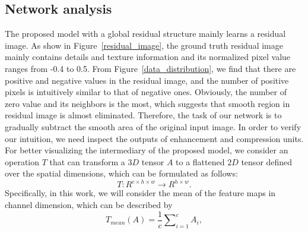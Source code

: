 \documentclass[10pt,twocolumn,letterpaper]{article}
\begin{document}
\subsection{Network analysis}
The proposed model with a global residual structure mainly learns a residual image. As show in Figure~\ref{residual_image}, the ground truth residual image mainly contains details and texture information and its normalized pixel value ranges from -0.4 to 0.5. From Figure~\ref{data_distribution}, we find that there are positive and negative values in the residual image, and the number of positive pixels is intuitively similar to that of negative ones. Obviously, the number of zero value and its neighbors is the most, which suggests that smooth region in residual image is almost eliminated. Therefore, the task of our network is to gradually subtract the smooth area of the original input image. In order to verify our intuition, we need inspect the outputs of enhancement and compression units. For better visualizing the intermediary of the proposed model, we consider an operation $T$ that can transform a $3D$ tensor $A$ to a flattened $2D$ tensor defined over the spatial dimensions, which can be formulated as follows:
\begin{equation}
T:{R^{c \times h \times w}} \to {R^{h \times w}}.
\end{equation}
Specifically, in this work, we will consider the mean of the feature maps in channel dimension, which can be described by
\begin{equation}
{T_{mean}}\left( A \right) = \frac{1}{c}\sum\nolimits_{i = 1}^c {{A_i}} ,
\end{equation}
\end{document}
